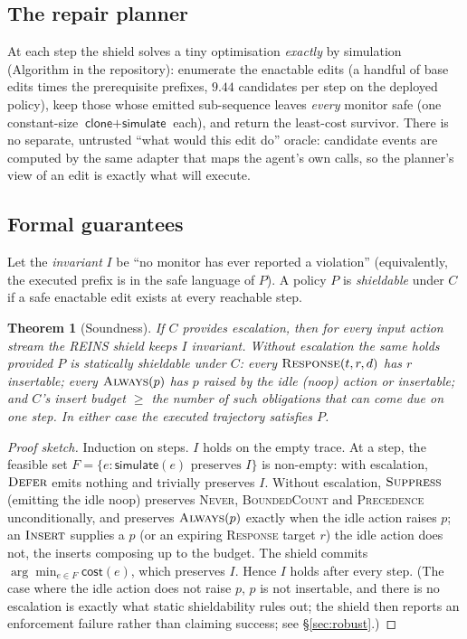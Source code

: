 \documentclass[11pt]{article}
\newtheorem{theorem}{Theorem}
\newcommand{\candMean}{9.44}\newcommand{\monMem}{386}\newcommand{\ledgerBytes}{690}
\begin{document}
\subsection{The repair planner}
At each step the shield solves a tiny optimisation \emph{exactly} by simulation
(Algorithm in the repository): enumerate the enactable edits (a handful of base
edits times the prerequisite prefixes, $\candMean$ candidates per step on the
deployed policy), keep those whose emitted sub-sequence leaves \emph{every}
monitor safe (one constant-size $\textsf{clone}+\textsf{simulate}$ each), and
return the least-cost survivor. There is no separate, untrusted ``what would this
edit do'' oracle: candidate events are computed by the same adapter that maps the
agent's own calls, so the planner's view of an edit is exactly what will execute.

\subsection{Formal guarantees}
Let the \emph{invariant} $I$ be ``no monitor has ever reported a violation''
(equivalently, the executed prefix is in the safe language of $P$). A policy $P$
is \emph{shieldable} under $C$ if a safe enactable edit exists at every reachable
step.

\begin{theorem}[Soundness]
\label{thm:sound}
If $C$ provides escalation, then for \emph{every} input action stream the REINS
shield keeps $I$ invariant. Without escalation the same holds provided $P$ is
\emph{statically shieldable} under $C$: every $\textsc{Response}(t,r,d)$ has $r$
insertable; every $\textsc{Always}(p)$ has $p$ raised by the idle (\textsf{noop})
action or insertable; and $C$'s insert budget $\ge$ the number of such obligations
that can come due on one step. In either case the executed trajectory satisfies
$P$.
\end{theorem}
\begin{proof}[Proof sketch]
Induction on steps. $I$ holds on the empty trace. At a step, the feasible set
$F=\{e : \textsf{simulate}(e)\text{ preserves }I\}$ is non-empty: with escalation,
$\textsc{Defer}$ emits nothing and trivially preserves $I$. Without escalation,
$\textsc{Suppress}$ (emitting the idle \textsf{noop}) preserves \textsc{Never},
\textsc{BoundedCount} and \textsc{Precedence} unconditionally, and preserves
$\textsc{Always}(p)$ exactly when the idle action raises $p$; an $\textsc{Insert}$
supplies a $p$ (or an expiring \textsc{Response} target $r$) the idle action does
not, the inserts composing up to the budget. The shield commits
$\arg\min_{e\in F}\textsf{cost}(e)$, which preserves $I$. Hence $I$ holds after
every step. (The case where the idle action does not raise $p$, $p$ is not
insertable, and there is no escalation is exactly what static shieldability rules
out; the shield then reports an enforcement failure rather than claiming success;
see \S\ref{sec:robust}.)
\end{proof}
\end{document}
